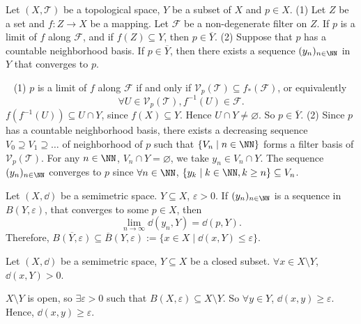 \begin{propositionenv}
    Let $(X,\mathscr{T})$ be a topological space, $Y$ be a subset of $X$ and $p\in X$.
    \newline
    (1) Let $Z$ be a set and $f:Z\longrightarrow X$ be a mapping. Let $\mathcal{F}$ be a non-degenerate filter on $Z$. If $p$ is a limit of $f$ along $\mathcal{F}$, and if $f(Z)\subseteq Y$, then $p\in \overline{Y}$.
    \newline
    (2) Suppose that $p$ has a countable neighborhood basis. If $p\in \overline{Y}$, then there exists a sequence $(y_n)_{n\in\NN}$ in $Y$ that converges to $p$.
\end{propositionenv}
\begin{proofenv}
    \ \newline
    (1) $p$ is a limit of $f$ along $\mathcal{F}$ if and only if $\mathcal{V}_p(\mathscr{T})\subseteq f_*(\mathcal{F})$, or equivalently 
    $$\forall U\in \mathcal{V}_p(\mathscr{T}), f^{-1}(U)\in \mathcal{F}.$$
    $f(f^{-1}(U))\subseteq U\cap Y$, since $f(X)\subseteq Y$. Hence $U\cap Y\neq \varnothing$. So $p\in \overline{Y}.$
    \newline
    (2) Since $p$ has a countable neighborhood basis, there exists a decreasing sequence $V_0\supseteq V_1\supseteq\ldots$ of neighborhood of $p$ such that $\{V_n\mid n\in \NN\}$ forms a filter basis of $\mathcal{V}_p(\mathscr{T})$. For any $n\in \NN$, $V_n\cap Y=\varnothing$, we take $y_n\in V_n\cap Y$. The sequence $(y_n)_{n\in \NN}$ converges to $p$ since $\forall n\in \NN$, $\{y_k\mid k\in\NN,k\ge n\}\subseteq V_n$.
\end{proofenv}
\begin{exampleenv}
    Let $(X,\dd)$ be a semimetric space. $Y\subseteq X$, $\varepsilon>0$. If $(y_n)_{n\in\NN}$ is a sequence in $B(Y,\varepsilon)$, that converges to some $p\in X$, then 
    $$\lim_{n\rightarrow \infty}\dd(y_n,Y)=\dd(p,Y).$$
    Therefore, $\overline{B(Y,\varepsilon)}\subseteq \overline{B}(Y,\varepsilon):=\{x\in X\mid \dd(x,Y)\le \varepsilon\}$.
\end{exampleenv}
\begin{propositionenv}
    Let $(X,\dd)$ be a semimetric space, $Y\subseteq X$ be a closed subset. $\forall x\in X\setminus Y$, $\dd(x,Y)>0$.
\end{propositionenv}
\begin{proofenv}
    $X\setminus Y$ is open, so $\exists \varepsilon>0$ such that $B(X,\varepsilon)\subseteq{ X\setminus Y}$. So $\forall y\in Y$, $\dd(x,y)\ge \varepsilon$. Hence, $\dd(x,y)\ge \varepsilon$.
\end{proofenv}
